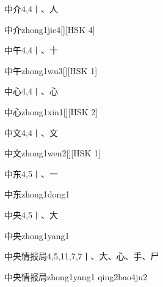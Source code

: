 \begin{entry}{中介}{4,4}{⼁、⼈}
  \begin{phonetics}{中介}{zhong1jie4}[][HSK 4]
  \end{phonetics}
\end{entry}

\begin{entry}{中午}{4,4}{⼁、⼗}
  \begin{phonetics}{中午}{zhong1wu3}[][HSK 1]
  \end{phonetics}
\end{entry}

\begin{entry}{中心}{4,4}{⼁、⼼}
  \begin{phonetics}{中心}{zhong1xin1}[][HSK 2]
  \end{phonetics}
\end{entry}

\begin{entry}{中文}{4,4}{⼁、⽂}
  \begin{phonetics}{中文}{zhong1wen2}[][HSK 1]
  \end{phonetics}
\end{entry}

\begin{entry}{中东}{4,5}{⼁、⼀}
  \begin{phonetics}{中东}{zhong1dong1}
  \end{phonetics}
\end{entry}

\begin{entry}{中央}{4,5}{⼁、⼤}
  \begin{phonetics}{中央}{zhong1yang1}
  \end{phonetics}
\end{entry}

\begin{entry}{中央情报局}{4,5,11,7,7}{⼁、⼤、⼼、⼿、⼫}
  \begin{phonetics}{中央情报局}{zhong1yang1 qing2bao4ju2}
  \end{phonetics}
\end{entry}

